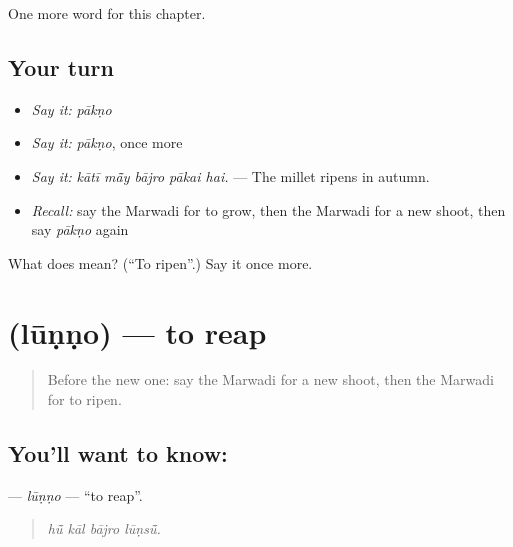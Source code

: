 \begin{grammarlens}[title={What you've built}]
One more word for this chapter.
\end{grammarlens}

\subsection*{Your turn}
\begin{itemize}
\raggedright
  \item \emph{Say it:} \emph{pākṇo}
  \item \emph{Say it:} \emph{pākṇo}, once more
  \item \emph{Say it:} \emph{kātī mā̃y bājro pākai hai.} — The millet ripens in autumn.
  \item \emph{Recall:} say the Marwadi for to grow, then the Marwadi for a new shoot, then say \emph{pākṇo} again
\end{itemize}

\begin{tcolorbox}[breakable,colback=teal!4,colframe=teal!35!black,title={Before you move on}]
What does  mean? (\textquotedblleft{}To ripen\textquotedblright{}.) Say it once more.
\end{tcolorbox}
\section[\texorpdfstring{\mw{लूणणो} (lūṇṇo)}{लूणणो (lūṇṇo)}]{ (lūṇṇo) — to reap}

\label{lesson:MW-C240-lunno}



\begin{quote}
Before the new one: say the Marwadi for a new shoot, then the Marwadi for to ripen.
\end{quote}

\subsection*{You'll want to know: }
\textbf{} — \emph{lūṇṇo} — \textquotedblleft{}to reap\textquotedblright{}.

\begin{quote}
   
\end{quote}

\begin{quote}
\emph{hū̃ kāl bājro lūṇsū̃.}
\end{quote}

